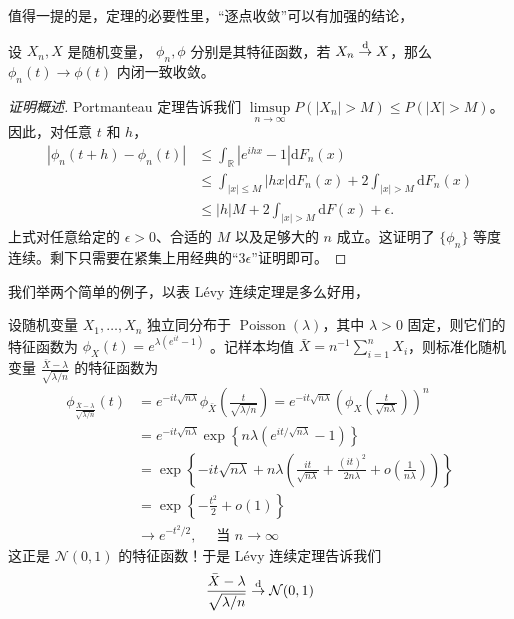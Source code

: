 值得一提的是，定理的必要性里，``逐点收敛''可以有加强的结论，

\begin{theorem*}

设 $X_n,X$ 是随机变量， $\phi_n,\phi$ 分别是其特征函数，若 $X_n\overset{\rm d}\to X$，那么 $\phi_n(t)\to \phi(t)$ 内闭一致收敛。

\end{theorem*}

\begin{proof}[证明概述]
Portmanteau 定理告诉我们 $\limsup\limits_{n\to \infty}P(|X_n|>M)\le P(|X|>M)$。因此，对任意 $t$ 和 $h$，
\[
\begin{aligned}
|\phi_n(t+h)-\phi_n(t)|
&\le\int_{\mathbb R}|e^{ihx}-1|\mathrm{d}F_n(x)\\
&\le \int_{|x|\le M}|hx|\mathrm{d}F_n(x)
 +2\int_{|x|>M}\mathrm{d}F_n(x)\\
&\le |h|M+2\int_{|x|>M}\mathrm{d}F(x)+\epsilon.
\end{aligned}
\]
上式对任意给定的 $\epsilon>0$、合适的 $M$ 以及足够大的 $n$ 成立。这证明了 $\{\phi_n\}$ 等度连续。剩下只需要在紧集上用经典的``$3\epsilon$''证明即可。
\end{proof}

我们举两个简单的例子，以表 Lévy 连续定理是多么好用，

\begin{example}\label{ex:ch2:poisson-clt}
设随机变量 $X_1, \ldots, X_n$ 独立同分布于 $\operatorname{Poisson}(\lambda)$，其中 $\lambda > 0$ 固定，则它们的特征函数为 $\phi_X(t) = e^{\lambda(e^{it} - 1)}$ 。记样本均值 $\bar{X} = n^{-1}\sum_{i=1}^n X_i$，则标准化随机变量 $\frac{\bar{X} - \lambda}{\sqrt{\lambda/n}}$ 的特征函数为\[\begin{aligned} \phi_{\frac{\bar{X} - \lambda}{\sqrt{\lambda/n}}}(t) &= e^{-it\sqrt{n\lambda}} \phi_{\bar{X}}\!\left(\frac{t}{\sqrt{\lambda/n}}\right) = e^{-it\sqrt{n\lambda}} \left(\phi_X\!\left(\frac{t}{\sqrt{n\lambda}}\right)\right)^n \\ &= e^{-it\sqrt{n\lambda}} \exp\left\{n\lambda\left(e^{it/\sqrt{n\lambda}} - 1\right)\right\} \\ &= \exp\left\{-it\sqrt{n\lambda} + n\lambda\left(\frac{it}{\sqrt{n\lambda}} + \frac{(it)^2}{2n\lambda} + o\!\left(\frac{1}{n\lambda}\right)\right)\right\} \\ &= \exp\left\{-\frac{t^2}{2} + o(1)\right\} \\ &\to e^{-t^2/2},\quad \text{ 当 }n\to\infty \end{aligned}\]
这正是 $\mathcal{N}(0,1)$ 的特征函数！于是 Lévy 连续定理告诉我们\[\frac{\bar{X} - \lambda}{\sqrt{\lambda/n}} \overset{\rm d}\to \mathcal{N}(0,1)\]

\end{example}

